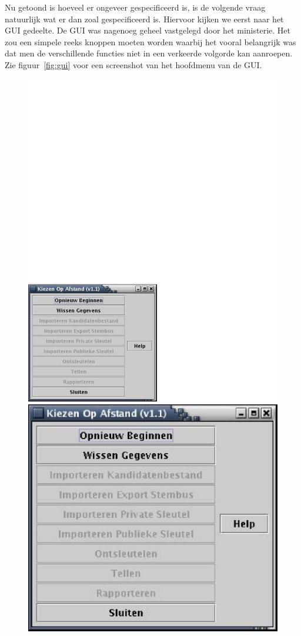 \documentclass{article}
\begin{document}
Nu getoond is hoeveel er ongeveer gespecificeerd is, is de volgende vraag
natuurlijk wat er dan zoal gespecificeerd is.
Hiervoor kijken we eerst naar het GUI gedeelte.
De GUI was nagenoeg geheel vastgelegd door het ministerie. Het zou een simpele reeks knoppen moeten worden waarbij het vooral belangrijk was dat men de 
verschillende functies niet in een verkeerde volgorde kan aanroepen.
Zie figuur~\ref{fig:gui} voor een screenshot van het hoofdmenu van de GUI.
\begin{figure}[htb]
  \begin{center}
    \ifpdf
    \includegraphics[scale=0.45]{scherm01}
    \else
    \includegraphics[scale=0.45]{scherm01.eps}

\end{center}
\end{figure}
\end{document}

